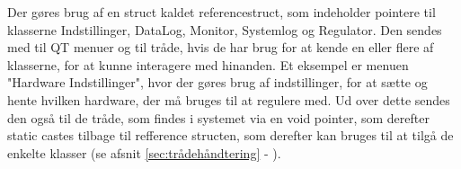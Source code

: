 Der gøres brug af en struct kaldet referencestruct, som indeholder pointere til klasserne Indstillinger, DataLog, Monitor, Systemlog og Regulator. Den sendes med til QT menuer og til tråde, hvis de har brug for at kende en eller flere af klasserne, for at kunne interagere med hinanden. Et eksempel er menuen "Hardware Indstillinger", hvor der gøres brug af indstillinger, for at sætte og hente hvilken hardware, der må bruges til at regulere med. Ud over dette sendes den også til de tråde, som findes i systemet via en void pointer, som derefter static castes tilbage til refference structen, som derefter kan bruges til at tilgå de enkelte klasser (se afsnit \ref{sec:trådehåndtering} - ).

\clearpage